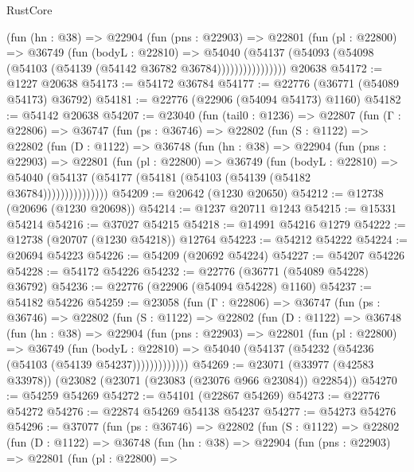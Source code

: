 \begin{lexlean}{RustCore}
\begin{coremodule}
                (fun (hn : @38) =>
                @22904
                  (fun (pns : @22903) =>
                  @22801
                    (fun (pl : @22800) =>
                    @36749
                      (fun (bodyL : @22810) =>
                      @54040
                        (@54137
                          (@54093 (@54098 (@54103 (@54139 (@54142 @36782 @36784))))))))))))))))
    @20638
@54172 := @1227 @20638
@54173 := @54172 @36784
@54177 := @22776 (@36771 (@54089 @54173) @36792)
@54181 := @22776 (@22906 (@54094 @54173) @1160)
@54182 := @54142 @20638
@54207 := @23040
    (fun (tail0 : @1236) =>
    @22807
      (fun (Γ : @22806) =>
      @36747
        (fun (ps : @36746) =>
        @22802
          (fun (S : @1122) =>
          @22802
            (fun (D : @1122) =>
            @36748
              (fun (hn : @38) =>
              @22904
                (fun (pns : @22903) =>
                @22801
                  (fun (pl : @22800) =>
                  @36749
                    (fun (bodyL : @22810) =>
                    @54040 (@54137 (@54177 (@54181 (@54103 (@54139 (@54182 @36784)))))))))))))))
@54209 := @20642 (@1230 @20650)
@54212 := @12738 (@20696 (@1230 @20698))
@54214 := @1237 @20711 @1243
@54215 := @15331 @54214
@54216 := @37027 @54215
@54218 := @14991 @54216 @1279
@54222 := @12738 (@20707 (@1230 @54218)) @12764
@54223 := @54212 @54222
@54224 := @20694 @54223
@54226 := @54209 (@20692 @54224)
@54227 := @54207 @54226
@54228 := @54172 @54226
@54232 := @22776 (@36771 (@54089 @54228) @36792)
@54236 := @22776 (@22906 (@54094 @54228) @1160)
@54237 := @54182 @54226
@54259 := @23058
    (fun (Γ : @22806) =>
    @36747
      (fun (ps : @36746) =>
      @22802
        (fun (S : @1122) =>
        @22802
          (fun (D : @1122) =>
          @36748
            (fun (hn : @38) =>
            @22904
              (fun (pns : @22903) =>
              @22801
                (fun (pl : @22800) =>
                @36749
                  (fun (bodyL : @22810) =>
                  @54040 (@54137 (@54232 (@54236 (@54103 (@54139 @54237)))))))))))))
@54269 := @23071 (@33977 (@42583 @33978)) (@23082 (@23071 (@23083 (@23076 @966 @23084)) @22854))
@54270 := @54259 @54269
@54272 := @54101 (@22867 @54269)
@54273 := @22776 @54272
@54276 := @22874 @54269 @54138 @54237
@54277 := @54273 @54276
@54296 := @37077
    (fun (ps : @36746) =>
    @22802
      (fun (S : @1122) =>
      @22802
        (fun (D : @1122) =>
        @36748
          (fun (hn : @38) =>
          @22904
            (fun (pns : @22903) =>
            @22801
              (fun (pl : @22800) =>

\end{coremodule}
\end{lexlean}
